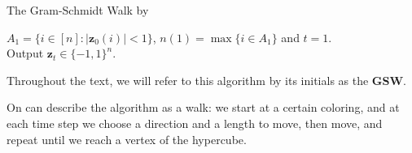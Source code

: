 \documentclass[12pt]{article}
\begin{document}
\begin{algorithm}[H]\label{walk}
{\fontsize{10}{12}
\caption{The Gram-Schmidt Walk by \cite{blues}}
   $A_1=\{i\in[n]:|\textbf{z}_0(i)|<1\}$, $n(1) = \max \{i \in A_1\}$ and $t=1$.\\
    Output $\textbf{z}_t\in\{-1,1\}^n$.
    }%
    \end{algorithm}
Throughout the text, we will refer to this algorithm by its initials as the \textbf{GSW}.%

On can describe the algorithm as a walk: we start at a certain coloring, and at each time step we choose a direction and a length to move, then move, and repeat until we reach a vertex of the hypercube.
\end{document}
